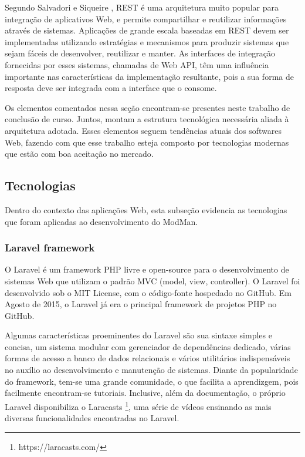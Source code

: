 Segundo Salvadori e Siqueire \citep{7195633}, REST é uma arquitetura muito popular para integração de aplicativos Web, e permite compartilhar e reutilizar informações através de sistemas. Aplicações de grande escala baseadas em REST devem ser implementadas utilizando estratégias e mecanismos para produzir sistemas que sejam fáceis de desenvolver, reutilizar e manter. As interfaces de integração fornecidas por esses sistemas, chamadas de Web API, têm uma influência importante nas características da implementação resultante, pois a sua forma de resposta deve ser integrada com a interface que o consome.
 
 
Os elementos comentados nessa seção encontram-se presentes neste trabalho de conclusão de curso. Juntos, montam a estrutura tecnológica necessária aliada à arquitetura adotada. Esses elementos seguem tendências atuais dos softwares Web, fazendo com que esse trabalho esteja composto por tecnologias modernas que estão com boa aceitação no mercado.


\subsection{Tecnologias}\label{tecnologias}


Dentro do contexto das aplicações Web, esta subseção evidencia as tecnologias que foram aplicadas ao desenvolvimento do ModMan.


\subsubsection{Laravel framework}


O Laravel é um framework PHP livre e open-source para o desenvolvimento de sistemas Web que utilizam o padrão MVC (model, view, controller). O Laravel foi desenvolvido sob o MIT License, com o código-fonte hospedado no GitHub. Em Agosto de 2015, o Laravel já era o principal framework de projetos PHP no GitHub. 


Algumas características proeminentes do Laravel são sua sintaxe simples e concisa, um sistema modular com gerenciador de dependências dedicado, várias formas de acesso a banco de dados relacionais e vários utilitários indispensáveis no auxílio ao desenvolvimento e manutenção de sistemas. Diante da popularidade do framework, tem-se uma grande comunidade, o que facilita a aprendizgem, pois facilmente encontram-se tutoriais. Inclusive, além da documentação, o próprio Laravel disponibiliza o Laracasts \footnote{https://laracasts.com/}, uma série de vídeos ensinando as mais diversas funcionalidades encontradas no Laravel.


